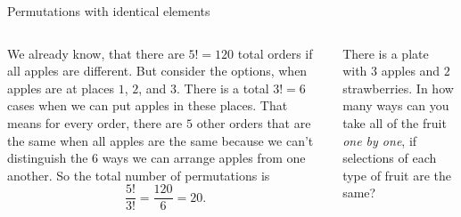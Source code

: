 \documentclass[9pt,aspectratio=169]{beamer}
\begin{document}
\begin{frame}{Permutations with identical elements}
\begin{columns}[T]
\begin{column}{0.5\textwidth}
      {\small
      We already know, that there are $5! = 120$ total orders if all apples are different. But consider the options, when apples are at places $1$, $2$, and $3$. There is a total $3! = 6$ cases when we can put apples in these places. That means for every order, there are $5$ other orders that are the same when all apples are the same because we can’t distinguish the $6$ ways we can arrange apples from one another. So the total number of permutations is}
      \[
        \frac{5!}{3!} = \frac{120}{6} = 20.
      \]
    \end{column}
    \begin{column}{0.5\textwidth}
      \begin{problem}
        There is a plate with $3$ apples and $2$ strawberries. In how many ways can you take all of the fruit \emph{one by one}, if selections of each type of fruit are the same?
      \end{problem}

      \begin{nscenter}
      \end{nscenter}


\end{column}
\end{columns}
\end{frame}
\end{document}
